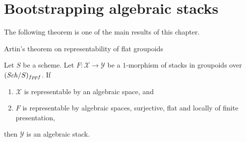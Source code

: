 \section{Bootstrapping algebraic stacks}
\label{section-bootstrap}

\noindent
The following theorem is one of the main results of this chapter.

\begin{theorem}
\label{theorem-bootstrap}
\begin{slogan}
Artin's theorem on representability of flat groupoids
\end{slogan}
Let $S$ be a scheme. Let $F : \mathcal{X} \to \mathcal{Y}$
be a $1$-morphism of stacks in groupoids over $(\mathit{Sch}/S)_{fppf}$. If
\begin{enumerate}
\item $\mathcal{X}$ is representable by an algebraic space, and
\item $F$ is representable by algebraic spaces, surjective, flat and
locally of finite presentation,
\end{enumerate}
then $\mathcal{Y}$ is an algebraic stack.
\end{theorem}

